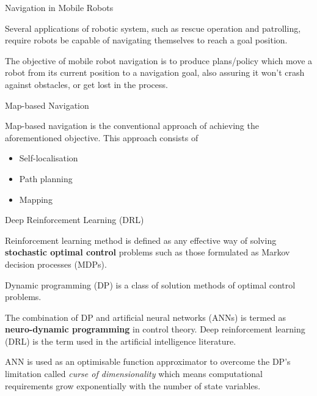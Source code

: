 \begin{frame}{Navigation in Mobile Robots}

Several applications of robotic system, such as rescue operation and patrolling, require robots be capable of navigating themselves to reach a goal position.

\bigskip

The objective of mobile robot navigation is to produce plans/policy which move a robot from its current position to a navigation goal, also assuring it won't crash against obstacles, or get lost in the process.

\end{frame}


\begin{frame}{Map-based Navigation}

Map-based navigation is the conventional approach of achieving the aforementioned objective. This approach consists of 

\begin{itemize}
   \item Self-localisation
   \item Path planning
   \item Mapping
\end{itemize}

\end{frame}


\begin{frame}{Deep Reinforcement Learning (DRL)}

Reinforcement learning method is defined as any effective way of solving \textbf{stochastic optimal control} problems such as those formulated as Markov decision processes (MDPs).

\bigskip

Dynamic programming (DP) is a class of solution methods of optimal control problems.

\bigskip

The combination of DP and artificial neural networks (ANNs) is termed as \textbf{neuro-dynamic programming} in control theory. Deep reinforcement learning (DRL) is the term used in the artificial intelligence literature.

\bigskip

ANN is used as an optimisable function approximator to overcome the DP's limitation called \textit{curse of dimensionality} which means computational requirements grow exponentially with the number of state variables.

\end{frame}
